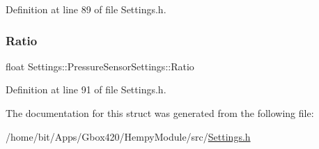 Definition at line 89 of file Settings.\+h.

\mbox{\label{struct_settings_1_1_pressure_sensor_settings_af7d412b16511d8a0381ff59788b4c781}} 
\subsubsection{\texorpdfstring{Ratio}{Ratio}}
{\footnotesize\ttfamily float Settings\+::\+Pressure\+Sensor\+Settings\+::\+Ratio}



Definition at line 91 of file Settings.\+h.



The documentation for this struct was generated from the following file\+:\begin{DoxyCompactItemize}
\item 
/home/bit/\+Apps/\+Gbox420/\+Hempy\+Module/src/\hyperlink{_hempy_module_2src_2_settings_8h}{Settings.\+h}\end{DoxyCompactItemize}
